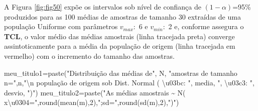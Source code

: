 \documentclass[
]{book}
\newenvironment{Shaded}{\begin{snugshade}}{\end{snugshade}}
\newcommand{\DecValTok}[1]{\textcolor[rgb]{0.00,0.00,0.81}{#1}}
\newcommand{\FunctionTok}[1]{\textcolor[rgb]{0.00,0.00,0.00}{#1}}
\newcommand{\NormalTok}[1]{#1}
\newcommand{\OtherTok}[1]{\textcolor[rgb]{0.56,0.35,0.01}{#1}}
\newcommand{\SpecialCharTok}[1]{\textcolor[rgb]{0.00,0.00,0.00}{#1}}
\newcommand{\StringTok}[1]{\textcolor[rgb]{0.31,0.60,0.02}{#1}}
\begin{document}
\hfill\break

A Figura \ref{fig:fig50} expõe os intervalos sob nível de confiança de \((1-\alpha)\)=95\% produzidos para as 100 médias de amostras de tamanho 30 extraídas de uma população Uniforme com parâmetros \(v_{max}:\) 6 e \(v_{min}:\) 2 e, conforme assegura o \textbf{TCL}, o valor médio das médias amostrais (linha tracejada preta) converge assintoticamente para a média da população de origem (linha tracejada em vermelho) com o incremento do tamanho das amostras.

\hfill\break

\begin{Shaded}
\begin{Highlighting}[]
\NormalTok{meu\_titulo1}\OtherTok{=}\FunctionTok{paste}\NormalTok{(}\StringTok{"Distribuição das médias de"}\NormalTok{, N, }\StringTok{"amostras de tamanho n="}\NormalTok{,n,}\StringTok{"}\SpecialCharTok{\textbackslash{}n}\StringTok{ população de origem sob Dist. Normal ( \textbackslash{}u03bc: "}\NormalTok{, media, }\StringTok{", \textbackslash{}u03c3: "}\NormalTok{, desvio, }\StringTok{")"}\NormalTok{)}
\NormalTok{meu\_titulo2}\OtherTok{=}\FunctionTok{paste}\NormalTok{(}\StringTok{"As médias amostrais \textasciitilde{} N( x\textbackslash{}u0304="}\NormalTok{,}\FunctionTok{round}\NormalTok{(}\FunctionTok{mean}\NormalTok{(m),}\DecValTok{2}\NormalTok{),}\StringTok{";sd="}\NormalTok{,}\FunctionTok{round}\NormalTok{(}\FunctionTok{sd}\NormalTok{(m),}\DecValTok{2}\NormalTok{),}\StringTok{")"}\NormalTok{)}


\end{Highlighting}
\end{Shaded}
\end{document}
